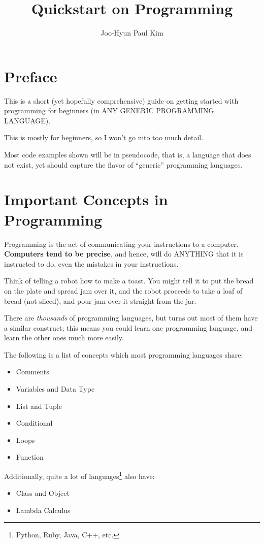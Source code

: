 \documentclass[12pt, a4paper]{article}
\title{Quickstart on Programming}
\author{Joo-Hyun Paul Kim}
\theoremstyle{definition}
\begin{document}
\maketitle
\tableofcontents
\setcounter{section}{-1}
\section{Preface}
This is a short (yet hopefully comprehensive) guide on
getting started with programming for beginners
(in ANY GENERIC PROGRAMMING LANGUAGE).

This is mostly for beginners, so I won't go into too much detail.

Most code examples shown will be in pseudocode, that is,
a language that does not exist,
yet should capture the flavor of ``generic'' programming languages.

\section{Important Concepts in Programming}
Programming is the act of communicating your instructions to a computer.
\textbf{Computers tend to be precise}, and hence, will do ANYTHING that
it is instructed to do, even the mistakes in your instructions.

Think of telling a robot how to make a toast.
You might tell it to put the bread on the plate and spread jam over it,
and the robot proceeds to take a loaf of bread (not sliced),
and pour jam over it straight from the jar.

There are \textit{thousands} of programming languages,
but turns out most of them have a similar construct;
this means you could learn one programming language,
and learn the other ones much more easily.

The following is a list of concepts which most programming languages share:
\begin{itemize}
    \item Comments
    \item Variables and Data Type
    \item List and Tuple
    \item Conditional
    \item Loops
    \item Function
\end{itemize}
Additionally, quite a lot of languages\footnote{Python, Ruby, Java, C++, etc.} also have:
\begin{itemize}
    \item Class and Object
    \item Lambda Calculus
\end{itemize}
\end{document}
